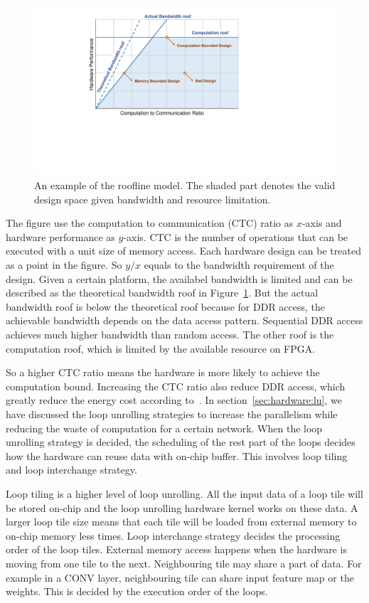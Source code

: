 \begin{figure}[h]
    \centering
    \includegraphics[width=0.6\columnwidth]{fig/roofline.pdf}
    \caption{An example of the roofline model. The shaded part denotes the valid design space given bandwidth and resource limitation.}
    \label{fig:roofline}
\end{figure}

The figure use the computation to communication (CTC) ratio as $x$-axis and hardware performance as $y$-axis. CTC is the number of operations that can be executed with a unit size of memory access. Each hardware design can be treated as a point in the figure. So $y/x$ equals to the bandwidth requirement of the design. Given a certain platform, the availabel bandwidth is limited and can be described as the theoretical bandwidth roof in Figure~\ref{fig:roofline}. But the actual bandwidth roof is below the theoretical roof because for DDR access, the achievable bandwidth depends on the data access pattern. Sequential DDR access achieves much higher bandwidth than random access. The other roof is the computation roof, which is limited by the available resource on FPGA.

So a higher CTC ratio means the hardware is more likely to achieve the computation bound. Increasing the CTC ratio also reduce DDR access, which greatly reduce the energy cost according to~\cite{vlsi_energy}. In section~\ref{sec:hardware:lu}, we have discussed the loop unrolling strategies to increase the parallelism while reducing the waste of computation for a certain network. When the loop unrolling strategy is decided, the scheduling of the rest part of the loops decides how the hardware can reuse data with on-chip buffer. This involves loop tiling and loop interchange strategy.

Loop tiling is a higher level of loop unrolling. All the input data of a loop tile will be stored on-chip and the loop unrolling hardware kernel works on these data. A larger loop tile size means that each tile will be loaded from external memory to on-chip memory less times. Loop interchange strategy decides the processing order of the loop tiles. External memory access happens when the hardware is moving from one tile to the next. Neighbouring tile may share a part of data. For example in a CONV layer, neighbouring tile can share input feature map or the weights. This is decided by the execution order of the loops. 

